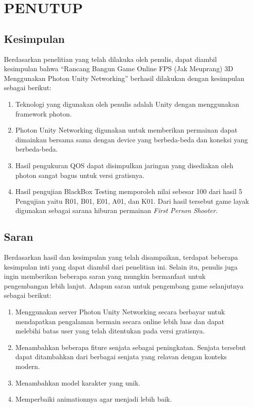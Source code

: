 \chapter{PENUTUP}
\section{Kesimpulan}
\noindent

Berdasarkan penelitian yang telah dilakuka oleh penulis, dapat diambil kesimpulan bahwa “Rancang Bangun Game Online FPS (Jak Meuprang) 3D Menggunakan Photon Unity Networking” berhasil dilakukan dengan kesimpulan sebagai berikut:
\begin{enumerate}
    \item Teknologi yang digunakan oleh penulis adalah Unity dengan menggunakan framework photon.
    \item Photon Unity Networking digunakan untuk memberikan permainan dapat dimainkan bersama sama dengan device yang berbeda-beda dan koneksi yang berbeda-beda.
    \item Hasil pengukuran QOS dapat disimpulkan jaringan yang disediakan oleh photon sangat bagus untuk versi gratisnya.
    \item Hasil pengujian BlackBox Testing memporoleh nilai sebesar 100 dari hasil 5 Pengujian yaitu R01, B01, E01, A01, dan K01. Dari hasil tersebut game layak digunakan sebagai sarana hiburan permainan \textit{First Person Shooter}.
\end{enumerate}

\section{Saran}
\noindent

Berdasarkan hasil dan kesimpulan yang telah disampaikan, terdapat beberapa kesimpulan inti yang dapat diambil dari penelitian ini. Selain itu, penulis juga ingin memberikan beberapa saran yang mungkin bermanfaat untuk pengembangan lebih lanjut. Adapun saran untuk pengembang game selanjutnya sebagai berikut:
\begin{enumerate}
    \item Menggunakan server Photon Unity Networking secara berbayar untuk mendapatkan pengalaman bermain secara online lebih luas dan dapat melebihi batas user yang telah ditentukan pada versi gratisnya.
    \item Menambahkan beberapa fiture senjata sebagai peningkatan. Senjata tersebut dapat ditambahkan dari berbagai senjata yang relavan dengan konteks modern.
    \item Menambahkan model karakter yang unik.
    \item Memperbaiki animationnya agar menjadi lebih baik.
\end{enumerate}